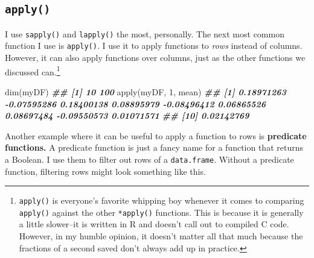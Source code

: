 \documentclass[
  12pt,
  krantz2]{krantz}
\makeatletter
\newenvironment{Shaded}{\begin{snugshade}}{\end{snugshade}}
\newcommand{\DecValTok}[1]{\textcolor[rgb]{0.06,0.06,0.06}{#1}}
\newcommand{\DocumentationTok}[1]{\textcolor[rgb]{0.37,0.37,0.37}{\textbf{\textit{#1}}}}
\newcommand{\FunctionTok}[1]{\textcolor[rgb]{0,0,0}{#1}}
\newcommand{\NormalTok}[1]{#1}
\newenvironment{kframe}{%
\medskip{}
\setlength{\fboxsep}{.8em}
 \def\at@end@of@kframe{}%
 \ifinner\ifhmode%
  \def\at@end@of@kframe{\end{minipage}}%
  \begin{minipage}{\columnwidth}%
 \fi\fi%
 \def\FrameCommand##1{\hskip\@totalleftmargin \hskip-\fboxsep
 \colorbox{shadecolor}{##1}\hskip-\fboxsep
     \hskip-\linewidth \hskip-\@totalleftmargin \hskip\columnwidth}%
 \MakeFramed {\advance\hsize-\width
   \@totalleftmargin\z@ \linewidth\hsize
   \@setminipage}}%
 {\par\unskip\endMakeFramed%
 \at@end@of@kframe}
\renewenvironment{Shaded}{\begin{kframe}}{\end{kframe}}
\makeatother
\begin{document}
\hypertarget{apply}{%
\subsection{\texorpdfstring{\texttt{apply()}}{apply()}}\label{apply}}

I use \texttt{sapply()} and \texttt{lapply()} the most, personally. The next most common function I use is \texttt{apply()}. I use it to apply functions to \emph{rows} instead of columns. However, it can also apply functions over columns, just as the other functions we discussed can.\footnote{\texttt{apply()} is everyone's favorite whipping boy whenever it comes to comparing \texttt{apply()} against the other \texttt{*apply()} functions. This is because it is generally a little slower--it is written in R and doesn't call out to compiled C code. However, in my humble opinion, it doesn't matter all that much because the fractions of a second saved don't always add up in practice.}

\begin{Shaded}
\begin{Highlighting}[]
\FunctionTok{dim}\NormalTok{(myDF)}
\DocumentationTok{\#\# [1]  10 100}
\FunctionTok{apply}\NormalTok{(myDF, }\DecValTok{1}\NormalTok{, mean)}
\DocumentationTok{\#\#  [1]  0.18971263 {-}0.07595286  0.18400138  0.08895979 {-}0.08496412  0.06865526  0.08697484 {-}0.09550573  0.01071571}
\DocumentationTok{\#\# [10]  0.02142769}
\end{Highlighting}
\end{Shaded}

Another example where it can be useful to apply a function to rows is \textbf{predicate functions.} A predicate function is just a fancy name for a function that returns a Boolean. I use them to filter out rows of a \texttt{data.frame}. Without a predicate function, filtering rows might look something like this.
\end{document}
